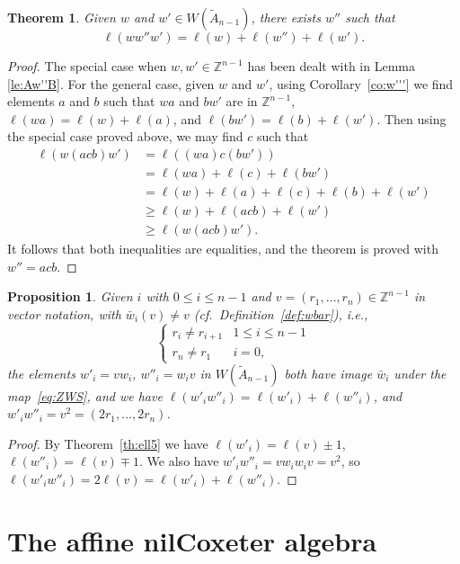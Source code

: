 \documentclass[12pt]{amsart}
\renewcommand{\ge}{\geqslant}
\renewcommand{\le}{\leqslant}
\newcommand{\bZ}{{\mathbb{Z}}}
\numberwithin{equation}{section}
\newtheorem{theorem}[equation]{Theorem}
\newtheorem{proposition}[equation]{Proposition}
\theoremstyle{definition}
\begin{document}
\begin{theorem}\label{th:ww''w'}
Given $w$ and $w'\in W(\tilde A_{n-1})$, there exists $w''$ such that 
\[ \ell(ww''w')=\ell(w)+\ell(w'')+\ell(w'). \]
\end{theorem}
\begin{proof}
The special case when $w,w'\in\bZ^{n-1}$ has been dealt with in Lemma
\ref{le:Aw''B}. For the general case, given $w$ and $w'$, using
Corollary~\ref{co:w'''} we find elements $a$ and $b$ such that $wa$
and $bw'$ are in $\bZ^{n-1}$, $\ell(wa)=\ell(w)+\ell(a)$, and
$\ell(bw')=\ell(b)+\ell(w')$. Then using the special case proved
above, we may find $c$ such that 
\begin{align*}
\ell(w(acb)w')&=\ell((wa)c(bw'))\\
&=\ell(wa)+\ell(c)+\ell(bw')\\
&=\ell(w)+\ell(a)+\ell(c)+\ell(b)+\ell(w')\\
&\ge\ell(w)+\ell(acb)+\ell(w')\\
&\ge\ell(w(acb)w').
\end{align*}
It follows that both inequalities are equalities, and the theorem is
proved with $w''=acb$.
\end{proof}


\begin{proposition}\label{pr:w'w''}
Given $i$ with $0\le i\le n-1$ and $v=(r_1,\dots,r_n)\in\bZ^{n-1}$ in
vector notation, with $\bar w_i(v)\ne v$ (cf.\ 
Definition~\ref{def:wbar}), i.e.,
\[ \begin{cases} r_i\ne r_{i+1} & 1\le i\le n-1 \\ r_n\ne r_1 &
    i=0, \end{cases} \] 
the elements $w'_i=vw_i$,
$w''_i=w_iv$ in 
$W(\tilde A_{n-1})$ both have image $\bar w_i$ under the
map~\eqref{eq:ZWS}, and we have
$\ell(w'_iw''_i)=\ell(w'_i)+\ell(w''_i)$, and
$w'_iw''_i=v^2=(2r_1,\dots,2r_n)$.
\end{proposition}
\begin{proof}
By Theorem~\ref{th:ell5} we have
$\ell(w'_i)=\ell(v)\pm 1$, $\ell(w''_i)=\ell(v)\mp 1$. 
We also have $w'_iw''_i=vw_iw_iv=v^2$, so
$\ell(w'_iw''_i)=2\ell(v)=\ell(w'_i)+\ell(w''_i)$. 
\end{proof}



\section{The affine nilCoxeter algebra}\label{se:N}
\end{document}
